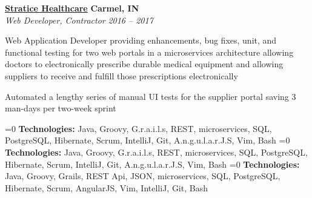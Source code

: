 %
    \headerrow
        {\textbf{\href{https://www.straticehealthcare.com/}{Stratice Healthcare}}}
        {\textbf{Carmel, IN}}
    \\
    \headerrow
        {\emph{Web Developer, Contractor}}
        {\emph{2016 -- 2017}}
    \begin{itemize*}
        \item Web Application Developer providing enhancements, bug fixes, unit, and functional testing for two
            web portals in a microservices architecture allowing doctors to electronically prescribe durable medical equipment and
            allowing suppliers to receive and fulfill those prescriptions electronically
        \item Automated a lengthy series of manual UI tests for the supplier portal saving 3 man-days per two-week sprint
    \end{itemize*}

    \ifnum{}=0
    \hspace{1.0em}
        {\textbf{Technologies:} Java, Groovy, G.r.a.i.l.s, REST, microservices, SQL, PostgreSQL, Hibernate, Scrum, IntelliJ, Git,
        A.n.g.u.l.a.r.J.S, Vim, Bash}
    \fi
    \ifnum{}=0
    \hspace{1.0em}
        {\textbf{Technologies:} Java, Groovy, G.r.a.i.l.s, REST, microservices, SQL, PostgreSQL, Hibernate, Scrum, IntelliJ, Git,
        A.n.g.u.l.a.r.J.S, Vim, Bash}
    \fi
    \ifnum{}=0
    \hspace{1.0em}
        {\textbf{Technologies:} Java, Groovy, Grails, REST Api, JSON, microservices, SQL, PostgreSQL, Hibernate, Scrum, AngularJS, Vim, IntelliJ, Git, Bash}
    \fi
